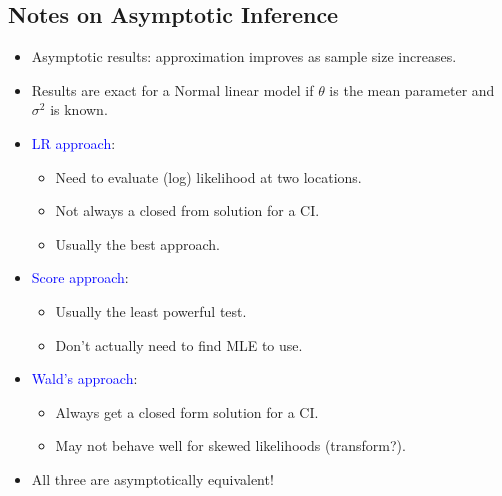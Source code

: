 \documentclass[oneside]{book}\usepackage[]{graphicx}\usepackage[svgnames]{xcolor}
\begin{document}
\subsection*{Notes on Asymptotic Inference}
\begin{itemize}
      \item Asymptotic results: approximation improves as sample size increases.
      \item Results are exact for a Normal linear model if $ \theta $ is the mean parameter and $ \sigma^2 $ is
            known.
      \item \textcolor{Blue}{LR approach}:
            \begin{itemize}
                  \item Need to evaluate (log) likelihood at two locations.
                  \item Not always a closed from solution for a CI\@.
                  \item Usually the best approach.
            \end{itemize}
      \item \textcolor{Blue}{Score approach}:
            \begin{itemize}
                  \item Usually the least powerful test.
                  \item Don't actually need to find MLE to use.
            \end{itemize}
      \item \textcolor{Blue}{Wald's approach}:
            \begin{itemize}
                  \item Always get a closed form solution for a CI\@.
                  \item May not behave well for skewed likelihoods (transform?).
            \end{itemize}
      \item All three are asymptotically equivalent!
\end{itemize}
\end{document}
